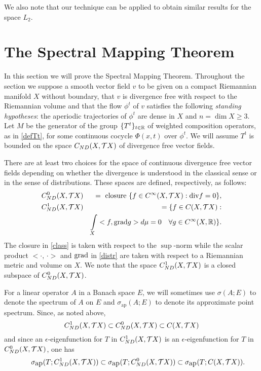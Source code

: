 We also note that our technique can be applied to obtain similar
results for the space $L_2$.

\section{The Spectral Mapping Theorem}
In this section we will prove the Spectral Mapping Theorem.
Throughout the section we suppose a smooth
vector field $v$ to be given
on a compact Riemannian manifold $X$ without boundary, that
$v$ is divergence free with respect to the Riemannian volume
and that the flow $\phi^t$ of $v$ satisfies the following
{\it standing hypotheses}:
the aperiodic trajectories of $\phi^t$ are
dense in $X$ and $n= \dim X \geq 3$.
Let $M$ be the generator of the group
$\{T^t\}_{t\in{\Bbb{R}}}$ of weighted
composition operators, as in \eqref{defTt},
for some continuous cocycle $\Phi(x,t)$
over $\phi^t$. We will assume $T^t$ is bounded on the space ${C_{ND}(X,{{\cal{T}}X})}$
of divergence free vector fields.

There are at least two choices for the  space of continuous
divergence free vector fields depending on whether the divergence is
understood in the classical sense or in the sense of distributions.
These spaces are defined, respectively, as follows:
\begin{eqnarray}
&C_{ND}^0(X,\TX) & =\text{ closure }
\{f\in C^\infty(X,\TX): \div f=0\}, \label{class}\\
 & C_{ND}^1(X,\TX) & = \{f\in\C :\nonumber\\
&&\int\limits_X <f,\grad g> d\mu =0 \quad  \forall
g\in C^\infty(X,\bbR)\}.\label{distr}
\end{eqnarray}
The closure in \eqref{class} is taken with respect to the $\sup$-norm
while the scalar product $<\cdot,\,\cdot>$ and $\hbox{\rm grad}$ in \eqref{distr}
are taken with respect to a  Riemannian metric and volume on $X$.
We note that the space $C_{ND}^1(X,{{\cal{T}}X})$
is a closed subspace of $C_{ND}^0(X,{{\cal{T}}X})$.

For a linear operator $A$ in a Banach
space $E$, we will sometimes use
$\sigma (A;E)$ to denote the spectrum of $A$ on $E$
and $\sigma_{\mbox{ap}}(A;E)$ to
denote its approximate point spectrum. Since, as noted above,
$$C_{ND}^1(X,{{\cal{T}}X})\subset C_{ND}^0(X,{{\cal{T}}X})\subset {C(X,{{\cal{T}}X})}$$
and since an $\epsilon$-eigenfunction for $T$
in $C_{ND}^1(X,{{\cal{T}}X})$ is an
$\epsilon$-eigenfunction for $T$ in
$C_{ND}^0(X,{{\cal{T}}X})$, one has
\begin{equation}\label{apprsp}
\hspace*{.25in}\sigma_{\mbox{ap}}(T;C_{ND}^1(X,{{\cal{T}}X}))
\subset \sigma_{\mbox{ap}}(T;C_{ND}^0(X,{{\cal{T}}X}))
\subset \sigma_{\mbox{ap}}(T;C(X,{{\cal{T}}X})).
\end{equation}


